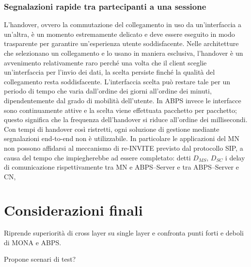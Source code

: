 \documentclass[12pt,a4paper,openright,twoside]{book}
\begin{document}
\subsection{Segnalazioni rapide tra partecipanti a una sessione}
L'handover, ovvero la commutazione del collegamento in uso da
un'interfaccia a un'altra, è un momento estremamente delicato e deve
essere eseguito in modo trasparente per garantire un'esperienza utente
soddisfacente. Nelle architetture che selezionano un collegamento e lo
usano in maniera esclusiva, l'handover è un avvenimento relativamente
raro perché una volta che il client sceglie un'interfaccia per l'invio
dei dati, la scelta persiste finché la qualità del collegamento resta
soddisfacente. L'interfaccia scelta può restare tale per un periodo di
tempo che varia dall'ordine dei giorni all'ordine dei minuti,
dipendentemente dal grado di mobilità dell'utente. In ABPS invece le
interfacce sono continuamente attive e la scelta viene effettuata
pacchetto per pacchetto; questo significa che la frequenza
dell'handover si riduce all'ordine dei millisecondi. Con tempi di
handover così ristretti, ogni soluzione di gestione mediante
segnalazioni end-to-end non è utilizzabile. In particolare le
applicazioni del MN non possono affidarsi al meccanismo di re-INVITE
previsto dal protocollo SIP, a causa del tempo che impiegherebbe ad
essere completato: detti $D_{MS}$, $D_{SC}$ i delay di comunicazione
rispettivamente tra MN e ABPS--Server e tra ABPS--Server e CN,


\clearpage{\pagestyle{empty}\cleardoublepage}


\chapter{Considerazioni finali}
Riprende superiorità di cross layer su single layer e confronta punti
forti e deboli di MONA e ABPS.

Propone scenari di test?

\clearpage{\pagestyle{empty}\cleardoublepage}


\end{document}

